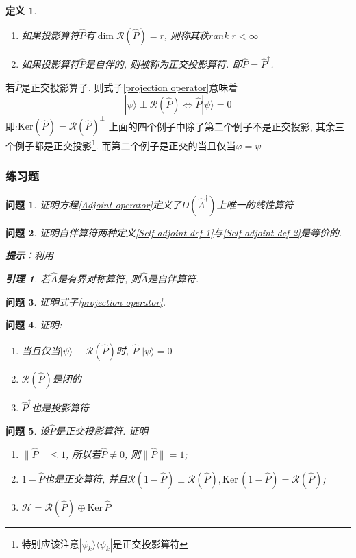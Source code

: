 \documentclass[a4paper,11pt]{article}
\newtheorem{definition}{\hspace{2em}定义}[section]
\newtheorem{lemma}{\hspace{2em}引理}[section]
\newtheorem{problem}{问题}[section]
\begin{document}
\begin{definition}
  \begin{enumerate}
    \item 如果投影算符$\hat{P}$有$\dim\mathcal{R}(\hat{P})=r$, 则称其秩$rank\;r<\infty$
    \item 如果投影算符$\hat{P}$是自伴的, 则被称为正交投影算符. 即$\hat{P}=\hat{P}^{\dag}$.
  \end{enumerate}
\end{definition}
若$\hat{P}$是正交投影算子, 则式子\eqref{projection operator}意味着
\begin{equation*}
  |\psi\rangle\perp\mathcal{R}(\hat{P})\Longleftrightarrow\hat{P}|\psi\rangle=0
\end{equation*}
即:$\mathrm{Ker}(\hat{P})=\mathcal{R}(\hat{P})^{\perp}$
上面的四个例子中除了第二个例子不是正交投影, 其余三个例子都是正交投影\footnote{特别应该注意$|\psi_k\rangle\langle\psi_k|$是正交投影算符}. 而第二个例子是正交的当且仅当$\varphi=\psi$
\subsubsection{练习题}
\begin{problem}
  证明方程\ref{Adjoint operator}定义了$D(\hat{A}^{\dag})$上唯一的线性算符
\end{problem}
\begin{problem}
  证明自伴算符两种定义\ref{Self-adjoint def 1}与\ref{Self-adjoint def 2}是等价的.

\indent\textbf{提示}：利用
\begin{lemma}
  若$\hat{A}$是有界对称算符, 则$\hat{A}$是自伴算符.
\end{lemma}
\end{problem}
\begin{problem}
  证明式子\eqref{projection operator}.
\end{problem}
\begin{problem}
  证明:
\begin{enumerate}
  \item 当且仅当$|\psi\rangle\perp\mathcal{R}(\hat{P})$时, $\hat{P}^{\dag}|\psi\rangle=0$
  \item $\mathcal{R}(\hat{P})$是闭的
  \item $\hat{P}^{\dag}$也是投影算符
\end{enumerate}
\end{problem}
\begin{problem}
  设$\hat{P}$是正交投影算符. 证明
  \begin{enumerate}
    \item $\|\hat{P}\|\leq1$, 所以若$\hat{P}\neq0$, 则$\|\hat{P}\|=1$;
    \item $1-\hat{P}$也是正交算符, 并且$\mathcal{R}(1-\hat{P})\perp\mathcal{R}(\hat{P}), \mathrm{Ker}\,(1-\hat{P})=\mathcal{R}(\hat{P})$;
    \item $\mathcal{H}=\mathcal{R}(\hat{P})\oplus \mathrm{Ker}\,\hat{P}$
  \end{enumerate}
\end{problem}
\end{document}
